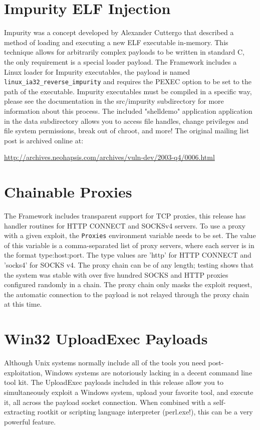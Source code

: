 \documentclass{report}
\begin{document}
\section{Impurity ELF Injection}
\par
Impurity was a concept developed by Alexander Cuttergo that described a method
of loading and executing a new ELF executable in-memory. This technique allows
for arbitrarily complex payloads to be written in standard C, the only
requirement is a special loader payload. The Framework includes a Linux loader
for Impurity executables, the payload is named
\texttt{linux\_ia32\_reverse\_impurity} and requires the PEXEC option to be set
to the path of the executable. Impurity executables must be compiled in a
specific way, please see the documentation in the src/impurity subdirectory
for more information about this process. The included "shelldemo" application
application in the data subdirectory allows you to access file handles, change
privileges and file system permissions, break out of chroot, and more! The
original mailing list post is archived online at:

\url{http://archives.neohapsis.com/archives/vuln-dev/2003-q4/0006.html}


\section{Chainable Proxies}
\par
The Framework includes transparent support for TCP proxies, this release has
handler routines for HTTP CONNECT and SOCKSv4 servers. To use a proxy with a
given exploit, the \texttt{Proxies} environment variable needs to be set. The value of
this variable is a comma-separated list of proxy servers, where each server is
in the format type:host:port. The type values are 'http' for HTTP CONNECT and
'socks4' for SOCKS v4. The proxy chain can be of any length; testing shows that
the system was stable with over five hundred SOCKS and HTTP proxies configured
randomly in a chain. The proxy chain only masks the exploit request, the
automatic connection to the payload is not relayed through the proxy chain at
this time. 

\section{Win32 UploadExec Payloads}
\par
Although Unix systems normally include all of the tools you need
post-exploitation, Windows systems are notoriously lacking in a decent command
line tool kit. The UploadExec payloads included in this release allow you to
simultaneously exploit a Windows system, upload your favorite tool, and execute
it, all across the payload socket connection. When combined with a
self-extracting rootkit or scripting language interpreter (perl.exe!), this can
be a very powerful feature. 
\end{document}
